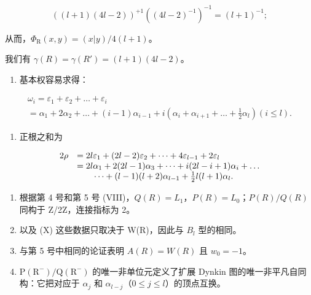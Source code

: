 \[
((l + 1) (4 l - 2)) ^ {+ 1} ((4 l - 2) ^ {- 1}) ^ {- 1} = (l + 1) ^ {- 1};
\]

从而，\(\Phi_{\mathrm{R}}(x,y) = (x|y) / 4(l + 1)\)。

我们有 \(\gamma(R) = \gamma(R') = (l + 1)(4l - 2)\)。

\begin{enumerate}
\def\labelenumi{(\Roman{enumi})}
\setcounter{enumi}{5}
\tightlist
\item
  基本权容易求得：
\end{enumerate}

\[
\begin{array}{l} \omega_ {i} = \varepsilon_ {1} + \varepsilon_ {2} + \dots + \varepsilon_ {i} \\ = \alpha_ {1} + 2 \alpha_ {2} + \dots + (i - 1) \alpha_ {i - 1} + i (\alpha_ {i} + \alpha_ {i + 1} + \dots + \frac {1}{2} \alpha_ {l}) (i \leqslant l). \end{array}
\]

\begin{enumerate}
\def\labelenumi{(\Roman{enumi})}
\setcounter{enumi}{6}
\tightlist
\item
  正根之和为
\end{enumerate}

\[
\begin{array}{r l} 2 \rho & = 2 l \varepsilon_ {1} + (2 l - 2) \varepsilon_ {2} + \dots + 4 \varepsilon_ {l - 1} + 2 \varepsilon_ {l} \\ & = 2 l \alpha_ {1} + 2 (2 l - 1) \alpha_ {3} + \dots + i (2 l - i + 1) \alpha_ {i} + \dots \\ & \qquad \dots + (l - 1) (l + 2) \alpha_ {l - 1} + \frac {1}{2} l (l + 1) \alpha_ {l}. \end{array}
\]

\begin{enumerate}
\def\labelenumi{(\Roman{enumi})}
\setcounter{enumi}{7}
\item
  根据第 4 号和第 5 号 (VIII)，\(Q(R) = L_{1}\)，\(P(R) = L_{0}\)；\(P(R)/Q(R)\) 同构于 Z/2Z，连接指标为 2。
\item
  以及 (X) 这些数据只取决于 W(R)，因此与 \(B_{l}\) 型的相同。
\item
  与第 5 号中相同的论证表明 \(A(R) = W(R)\) 且 \(w_0 = -1\)。
\item
  \(\mathrm{P}(\mathrm{R}^{-})/\mathrm{Q}(\mathrm{R}^{-})\) 的唯一非单位元定义了扩展 Dynkin 图的唯一非平凡自同构：它把对应于 \(\alpha_{j}\) 和 \(\alpha_{l-j}\)（\(0 \leqslant j \leqslant l\)）的顶点互换。
\end{enumerate}

